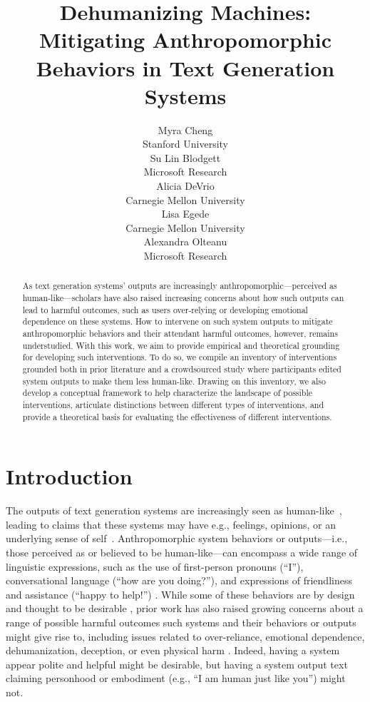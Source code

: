 \documentclass[11pt]{article}
\title{Dehumanizing Machines: \\ Mitigating Anthropomorphic Behaviors in Text Generation Systems}
\author{
Myra Cheng \\
Stanford University \\\And
Su Lin Blodgett \\
Microsoft Research \\\And
Alicia DeVrio \\
Carnegie Mellon University \\\AND
Lisa Egede \\
Carnegie Mellon University \\\And
Alexandra Olteanu \\
Microsoft Research \\  
}
\newcounter{intervention}  %
\begin{document}
\maketitle
\begin{abstract}
As text generation systems' outputs are increasingly anthropomorphic---perceived as human-like---scholars have also raised increasing concerns about how such outputs can lead to harmful outcomes, such as users over-relying or developing emotional dependence on these systems.  
How to intervene on such system outputs to mitigate anthropomorphic behaviors and their attendant harmful outcomes, however, remains understudied. 
With this work, we aim to provide empirical and theoretical grounding for developing such interventions. 
To do so, we compile an inventory of interventions grounded both in prior literature and a crowdsourced study where participants edited system outputs to make them less human-like.
Drawing on this inventory, we also develop a conceptual framework to help characterize the landscape of possible interventions, articulate distinctions between different types of interventions, and provide a theoretical basis for evaluating the effectiveness of different interventions. 

\end{abstract}


\section{Introduction}
The outputs of text generation systems are increasingly seen as human-like~\cite{akbulut2024all,cheng-etal-2024-anthroscore,mitchell2024metaphors}, leading to claims that these systems may have e.g., feelings, opinions, or an underlying sense of self~\cite[e.g.,][]{friedman1992human,Tiku2022google,y2022large,halmers2023could,cheng2024one}. 
Anthropomorphic system behaviors or outputs---i.e., those perceived as or believed to be human-like---can encompass a wide range of linguistic expressions, such as the use of first-person pronouns (``I''), conversational language (``how are you doing?''), and expressions of friendliness and assistance (``happy to help!'') \cite{Emnett2024-na,devrio2025taxonomy}. 
While some of these behaviors are by design and thought to be desirable \cite[e.g.,][]{schanke2021estimating, kim2024anthropomorphism}, prior work has also raised growing concerns about a range of possible harmful outcomes such systems and their behaviors or outputs might give rise to, including issues related to over-reliance, emotional dependence, dehumanization, deception, or even physical harm \cite[e.g.,][]{Ischen2020-it,Porra2020-dq,Chan2023-nd,chandra2024lived,cheng2024one,payne2024ai,Rothman.2024}. 
Indeed, having a system appear polite and helpful might be desirable, but having a system output text claiming personhood or embodiment (e.g., ``I am human just like you'') might not. 
\end{document}
